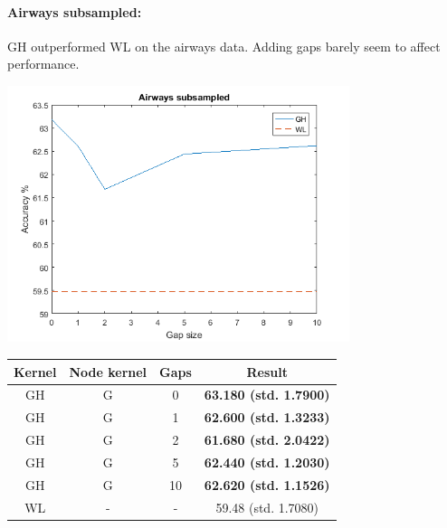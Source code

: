 \documentclass{article}
\begin{document}
\paragraph{Airways subsampled:}
GH outperformed WL on the airways data. Adding gaps barely seem to affect performance.\\
\begin{minipage}{0.6\linewidth}
	\hspace*{-1in}
	\includegraphics[width=10cm]{airways}
	\label{fig:airways}
\end{minipage}
\begin{minipage}[c]{0.5\linewidth}
	
	\centering
	\begin{tabular}{c|c|c|c}
		Kernel & Node kernel & Gaps & Result\\
		\hline
		GH & G & 0 & \textbf{63.180 (std. 1.7900)}\\
		GH & G & 1 & \textbf{62.600 (std. 1.3233)}\\
		GH & G & 2 & \textbf{61.680 (std. 2.0422)}\\
		GH & G & 5 & \textbf{62.440 (std. 1.2030)}\\
		GH & G & 10 & \textbf{62.620 (std. 1.1526)}\\
		WL & - & - & 59.48 (std. 1.7080)
	\end{tabular}
	\label{table:airways}
\end{minipage}
\end{document}
